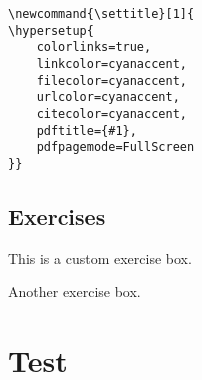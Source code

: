 \documentclass[openany]{book}
\begin{document}
\begin{longlisting}
\begin{verbatim}
\newcommand{\settitle}[1]{
\hypersetup{
    colorlinks=true,
    linkcolor=cyanaccent,
    filecolor=cyanaccent,
    urlcolor=cyanaccent,
    citecolor=cyanaccent,
    pdftitle={#1},
    pdfpagemode=FullScreen
}}
\end{verbatim}
\end{longlisting}

\section{Exercises}
\begin{myexercise}
This is a custom exercise box.
\end{myexercise}

\begin{myexercise}
Another exercise box.
\end{myexercise}

\chapter{Test}
\chapterpage
\lipsum[3-4]
\end{document}
